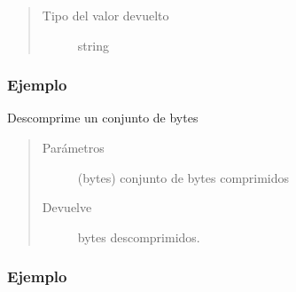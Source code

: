 \documentclass[a4paper,12pt,spanish]{sphinxmanual}
\begin{document}
\begin{fulllineitems}
\begin{fulllineitems}
\begin{quote}
\begin{description}
\item[{Tipo del valor devuelto}] \leavevmode
string

\end{description}\end{quote}
\subsubsection*{Ejemplo}

\begin{sphinxVerbatim}[commandchars=\\\{\}]
   
  
\end{sphinxVerbatim}

\end{fulllineitems}


\begin{fulllineitems}
\label{\detokenize{openerm.Compressor:openerm.Compressor.Compressor.decompress}}
Descomprime un conjunto de bytes
\begin{quote}\begin{description}
\item[{Parámetros}] \leavevmode
{} \textendash{} (bytes) conjunto de bytes comprimidos

\item[{Devuelve}] \leavevmode
bytes descomprimidos.

\end{description}\end{quote}
\subsubsection*{Ejemplo}


\end{fulllineitems}
\end{fulllineitems}
\end{document}

